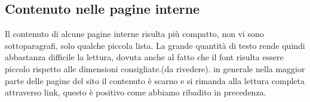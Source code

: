\documentclass[12pt]{article}
\begin{document}
\subsection{Contenuto nelle pagine interne}

	  Il contenuto di alcune pagine interne risulta pi\`u compatto, non vi sono sottoparagrafi, solo qualche piccola lista. La grande quantit\`a di testo rende quindi abbastanza difficile la lettura, dovuta anche al fatto che il font risulta essere piccolo rispetto alle dimensioni consigliate.(da rivedere).
	in generale nella maggior parte delle pagine del sito il contenuto \`e scarno e si rimanda alla lettura completa attraverso link, questo \`e positivo come abbiamo ribadito in precedenza.
\end{document}
